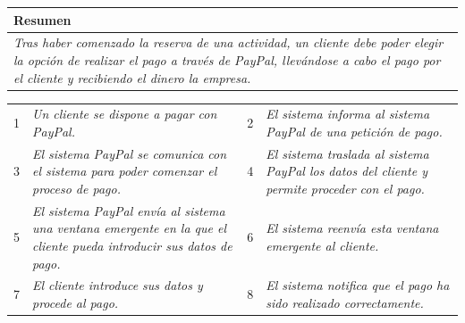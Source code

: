    \begin{table}[H]
        \begin{tabular}{llllllll}
    \hline
    \multicolumn{8}{|l|}{\cellcolor[HTML]{F2F2F2}Resumen}                                                                                                                                                                                                                                                                                                                                                                                             \\ \hline
    \multicolumn{8}{|p{15cm}|}{{\color[HTML]{808080} \textit{Tras haber comenzado la reserva de una actividad, un cliente debe poder elegir la opción de realizar el pago a través de PayPal, llevándose a cabo el pago por el cliente y recibiendo el dinero la empresa.}}} \\ \hline
    \end{tabular}
    \end{table}

    \begin{table}[h!]
        \centering
        \begin{tabular}{|p{0.6cm}|p{6.5cm}|p{0.6cm}|p{6.5cm}|}
        \rowcolor{lightgray}
        \hline
        \multicolumn{4}{|l|}{Curso Normal (Básico)} \\
        \hline
        1 & \color[HTML]{808080}\textit{Un cliente se dispone a pagar con PayPal.} & 2 & \color[HTML]{808080}\textit{El sistema informa al sistema PayPal de una petición de pago.} \\
        \hline
        3 & \color[HTML]{808080}\textit{El sistema PayPal se comunica con el sistema para poder comenzar el proceso de pago.} & 4 & \color[HTML]{808080}\textit{El sistema traslada al sistema PayPal los datos del cliente y permite proceder con el pago.} \\
        \hline
        5 & \color[HTML]{808080}\textit{El sistema PayPal envía al sistema una ventana emergente en la que el cliente pueda introducir sus datos de pago.} & 6 & \color[HTML]{808080}\textit{El sistema reenvía esta ventana emergente al cliente.} \\
        \hline
        7 & \color[HTML]{808080}\textit{El cliente introduce sus datos y procede al pago.} & 8 & \color[HTML]{808080}\textit{El sistema notifica que el pago ha sido realizado correctamente.} \\
        \hline
        \end{tabular}
        \end{table}
        
